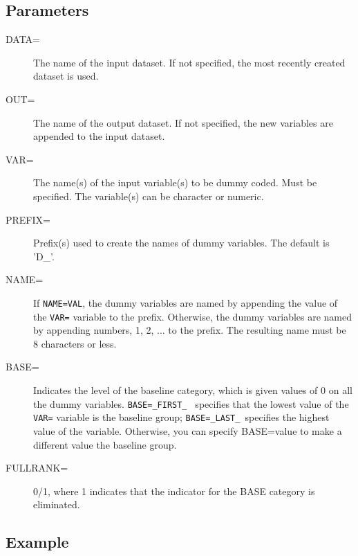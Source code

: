 \subsection*{Parameters\label{Parameters}}
\begin{description}

\item[DATA=] \mbox{}

The name of the input dataset.  If not specified, the most
 recently created dataset is used.


\item[OUT=] \mbox{}

The name of the output dataset.  If not specified, the new
variables are appended to the input dataset.


\item[VAR=] \mbox{}

The name(s) of the input variable(s) to be dummy coded.  Must be
specified.  The variable(s) can be character or numeric.


\item[PREFIX=] \mbox{}

Prefix(s) used to create the names of dummy variables.  The
default is 'D\_'.


\item[NAME=] \mbox{}

If \texttt{NAME=VAL}, the dummy variables are named by appending the
value of the \texttt{VAR=} variable to the prefix.  Otherwise, the
dummy variables are named by appending numbers, 1, 2, ...
to the prefix.  The resulting name must be 8 characters or
less.


\item[BASE=] \mbox{}

Indicates the level of the baseline category, which is given
values of 0 on all the dummy variables.  \texttt{BASE=\_FIRST\_ }
specifies that the lowest value of the \texttt{VAR=} variable is the
baseline group; \texttt{BASE=\_LAST\_ }specifies the highest value of
the variable.  Otherwise, you can specify BASE=value to
make a different value the baseline group.


\item[FULLRANK=] \mbox{}

0/1, where 1 indicates that the indicator for the BASE category
          is eliminated.

\end{description}
\subsection*{Example\label{Example}}


